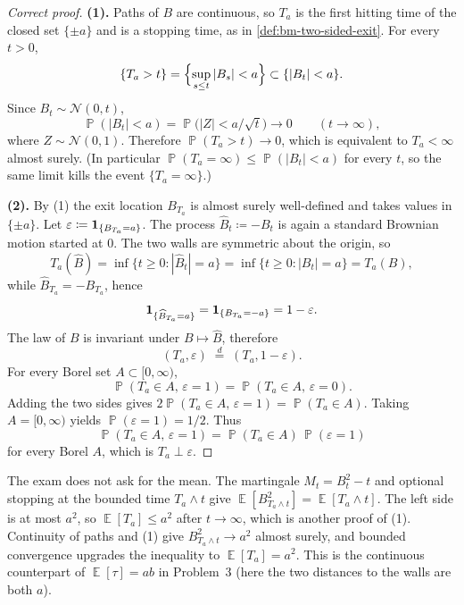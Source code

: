 \documentclass[11pt,a4paper]{article}
\DeclareMathOperator{\E}{\mathbb{E}}
\DeclareMathOperator{\Pbb}{\mathbb{P}}
\begin{document}
\begin{proof}[Correct proof]
\textbf{(1).}
Paths of \( B \) are continuous, so \( T_a \) is the first hitting time of the closed set \( \{\pm a\} \) and is a stopping time, as in \cref{def:bm-two-sided-exit}. For every \( t>0 \),
\[
\{T_a>t\}
=
\Bigl\{\sup_{s\le t}|B_s|<a\Bigr\}
\subset
\{|B_t|<a\}.
\]
Since \( B_t\sim\mathcal{N}(0,t) \),
\[
\Pbb(|B_t|<a)
=
\Pbb\bigl(|Z|<a/\sqrt{t}\bigr)
\to 0
\qquad
(t\to\infty),
\]
where \( Z\sim\mathcal{N}(0,1) \). Therefore \( \Pbb(T_a>t)\to 0 \), which is equivalent to \( T_a<\infty \) almost surely. (In particular \( \Pbb(T_a=\infty)\le\Pbb(|B_t|<a) \) for every \( t \), so the same limit kills the event \( \{T_a=\infty\} \).)

\textbf{(2).}
By (1) the exit location \( B_{T_a} \) is almost surely well-defined and takes values in \( \{\pm a\} \). Let \( \varepsilon\coloneqq\mathbf{1}_{\{B_{T_a}=a\}} \). The process \( \widehat{B}_t\coloneqq -B_t \) is again a standard Brownian motion started at \( 0 \). The two walls are symmetric about the origin, so
\[
T_a(\widehat{B})
=
\inf\{t\ge 0:|\widehat{B}_t|=a\}
=
\inf\{t\ge 0:|B_t|=a\}
=
T_a(B),
\]
while \( \widehat{B}_{T_a}=-B_{T_a} \), hence
\[
\mathbf{1}_{\{\widehat{B}_{T_a}=a\}}
=
\mathbf{1}_{\{B_{T_a}=-a\}}
=
1-\varepsilon.
\]
The law of \( B \) is invariant under \( B\mapsto\widehat{B} \), therefore
\[
(T_a,\varepsilon)
\;\stackrel{d}{=}\;
(T_a,1-\varepsilon).
\]
For every Borel set \( A\subset[0,\infty) \),
\[
\Pbb(T_a\in A,\,\varepsilon=1)
=
\Pbb(T_a\in A,\,\varepsilon=0).
\]
Adding the two sides gives \( 2\Pbb(T_a\in A,\,\varepsilon=1)=\Pbb(T_a\in A) \). Taking \( A=[0,\infty) \) yields \( \Pbb(\varepsilon=1)=1/2 \). Thus
\[
\Pbb(T_a\in A,\,\varepsilon=1)
=
\Pbb(T_a\in A)\,\Pbb(\varepsilon=1)
\]
for every Borel \( A \), which is \( T_a\perp\varepsilon \).
\end{proof}

\begin{remark}[{Optional: \( \E[T_a]=a^{2} \)}]
\label{rem:p5-mean-exit}
The exam does not ask for the mean. The martingale \( M_t=B_t^{2}-t \) and optional stopping at the bounded time \( T_a\wedge t \) give \( \E[B_{T_a\wedge t}^{2}]=\E[T_a\wedge t] \). The left side is at most \( a^{2} \), so \( \E[T_a]\le a^{2} \) after \( t\to\infty \), which is another proof of (1). Continuity of paths and (1) give \( B_{T_a\wedge t}^{2}\to a^{2} \) almost surely, and bounded convergence upgrades the inequality to \( \E[T_a]=a^{2} \). This is the continuous counterpart of \( \E[\tau]=ab \) in Problem~3 (here the two distances to the walls are both \( a \)).
\end{remark}
\end{document}
